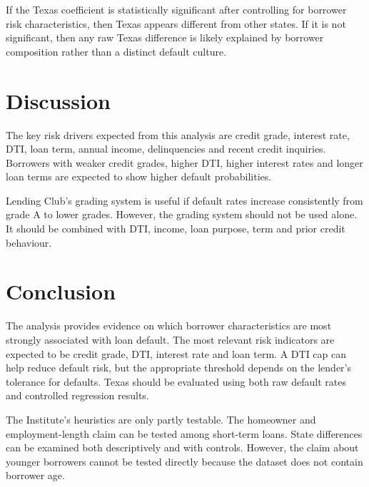 \documentclass[11pt,preprint]{elsarticle}
\numberwithin{equation}{section}
\numberwithin{figure}{section}
\numberwithin{table}{section}
\begin{document}
If the Texas coefficient is statistically significant after controlling
for borrower risk characteristics, then Texas appears different from
other states. If it is not significant, then any raw Texas difference is
likely explained by borrower composition rather than a distinct default
culture.

\section{Discussion}\label{discussion}

The key risk drivers expected from this analysis are credit grade,
interest rate, DTI, loan term, annual income, delinquencies and recent
credit inquiries. Borrowers with weaker credit grades, higher DTI,
higher interest rates and longer loan terms are expected to show higher
default probabilities.

Lending Club's grading system is useful if default rates increase
consistently from grade A to lower grades. However, the grading system
should not be used alone. It should be combined with DTI, income, loan
purpose, term and prior credit behaviour.

\section{Conclusion}\label{conclusion}

The analysis provides evidence on which borrower characteristics are
most strongly associated with loan default. The most relevant risk
indicators are expected to be credit grade, DTI, interest rate and loan
term. A DTI cap can help reduce default risk, but the appropriate
threshold depends on the lender's tolerance for defaults. Texas should
be evaluated using both raw default rates and controlled regression
results.

The Institute's heuristics are only partly testable. The homeowner and
employment-length claim can be tested among short-term loans. State
differences can be examined both descriptively and with controls.
However, the claim about younger borrowers cannot be tested directly
because the dataset does not contain borrower age.


\end{document}
